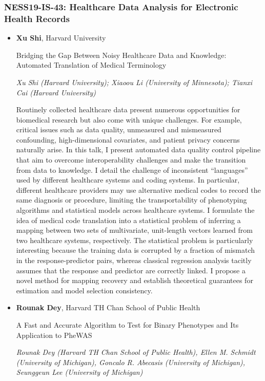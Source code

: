 \subsubsection*{NESS19-IS-43: Healthcare Data Analysis for Electronic Health Records}

\begin{itemize}
\item \textbf{Xu Shi}, Harvard University

Bridging the Gap Between Noisy Healthcare Data and Knowledge: Automated Translation of Medical Terminology

\emph{\footnotesize Xu Shi (Harvard University); Xiaoou Li (University of Minnesota); Tianxi Cai (Harvard University)}

Routinely collected healthcare data present numerous opportunities for biomedical research but also come with unique challenges. For example, critical issues such as data quality, unmeasured and mismeasured confounding, high-dimensional covariates, and patient privacy concerns naturally arise. In this talk, I present automated data quality control pipeline that aim to overcome interoperability challenges and make the transition from data to knowledge. I detail the challenge of inconsistent “languages” used by different healthcare systems and coding systems. In particular, different healthcare providers may use alternative medical codes to record the same diagnosis or procedure, limiting the transportability of phenotyping algorithms and statistical models across healthcare systems. I formulate the idea of medical code translation into a statistical problem of inferring a mapping between two sets of multivariate, unit-length vectors learned from two healthcare systems, respectively. The statistical problem is particularly interesting because the training data is corrupted by a fraction of mismatch in the response-predictor pairs, whereas classical regression analysis tacitly assumes that the response and predictor are correctly linked. I propose a novel method for mapping recovery and establish theoretical guarantees for estimation and model selection consistency.

\item \textbf{Rounak Dey}, Harvard TH Chan School of Public Health

A Fast and Accurate Algorithm to Test for Binary Phenotypes and Its Application to PheWAS

\emph{\footnotesize Rounak Dey (Harvard TH Chan School of Public Health), Ellen M. Schmidt (University of Michigan), Goncalo R. Abecasis (University of Michigan), Seunggeun Lee (University of Michigan)}


\end{itemize}
